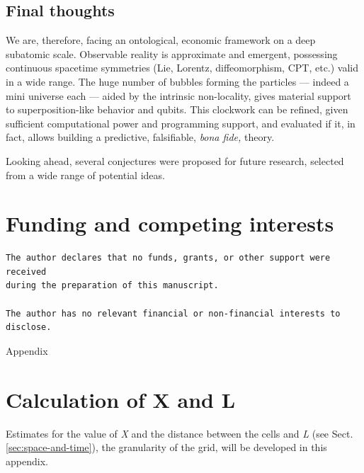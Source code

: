 \documentclass[12pt,english]{article}
\begin{document}
\subsection{Final thoughts}
We are, therefore, facing an ontological, economic framework on a deep subatomic scale. Observable reality is approximate and emergent, possessing continuous spacetime symmetries (Lie, Lorentz, diffeomorphism, CPT, etc.) valid in a wide range. The huge number of bubbles forming the particles --- indeed a mini universe each --- aided by the intrinsic non-locality, gives material support to superposition-like behavior and qubits. This clockwork can be refined, given sufficient computational power and programming support, and evaluated if it, in fact, allows building a predictive, falsifiable, \emph{bona fide,} theory.

Looking ahead, several conjectures were proposed for future research, selected from a wide range of potential ideas.


\section*{Funding and competing interests}
\begin{verbatim}
The author declares that no funds, grants, or other support were received 
during the preparation of this manuscript.

The author has no relevant financial or non-financial interests to disclose.
\end{verbatim}

\printbibliography


\newpage{}


\appendix
\begin{center}
{\LARGE{}Appendix}{\LARGE\par}
\par\end{center}

\section{Calculation of X and L\label{sec:Calculation-of-X}}

Estimates for the value of \emph{X} and the distance between the cells
and \emph{L} (see Sect. \ref{sec:space-and-time}), the granularity
of the grid, will be developed in this appendix.
\end{document}

